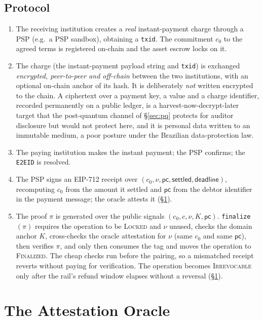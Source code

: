 \documentclass[11pt]{article}
\newcommand{\code}[1]{\texttt{#1}}
\begin{document}
\subsection{Protocol}
\begin{enumerate}
\item The receiving institution creates a \emph{real} instant-payment charge
through a PSP (e.g.\ a PSP sandbox), obtaining a \code{txid}. The commitment
$c_0$ to the agreed terms is registered on-chain and the asset escrow locks on
it.
\item The charge (the instant-payment payload string and \code{txid}) is
exchanged \emph{encrypted, peer-to-peer and off-chain} between the two
institutions, with an optional on-chain anchor of its hash. It is deliberately
\emph{not} written encrypted to the chain. A ciphertext over a payment key, a
value and a charge identifier, recorded permanently on a public ledger, is a
harvest-now-decrypt-later target that the post-quantum channel of
\S\ref{sec:pq} protects for auditor disclosure but would not protect here, and
it is personal data written to an immutable medium, a poor posture under the
Brazilian data-protection law.
\item The paying institution makes the instant payment; the PSP confirms; the
\code{E2EID} is resolved.
\item The PSP signs an EIP-712 receipt over $(c_0,\nu,\mathsf{pc},\mathsf{settled},
\mathsf{deadline})$, recomputing $c_0$ from the amount it settled and
$\mathsf{pc}$ from the debtor identifier in the payment message; the oracle
attests it (\S\ref{sec:oracle}).
\item The proof $\pi$ is generated over the public signals
$(c_0,c,\nu,K,\mathsf{pc})$. \code{finalize}$(\pi)$ requires the operation to be
\textsc{Locked} and $\nu$ unused, checks the domain anchor $K$, cross-checks the
oracle attestation for $\nu$ (same $c_0$ and same $\mathsf{pc}$), then verifies
$\pi$, and only then consumes the tag and moves the operation to
\textsc{Finalized}. The cheap checks run before the pairing, so a mismatched
receipt reverts without paying for verification. The operation becomes
\textsc{Irrevocable} only after the rail's refund window elapses without a
reversal (\S\ref{sec:oracle}).
\end{enumerate}

\section{The Attestation Oracle}
\label{sec:oracle}
\end{document}
